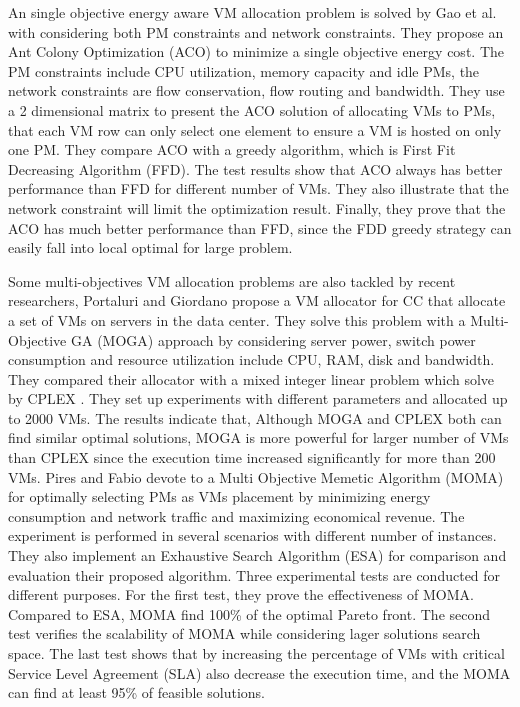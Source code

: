 \documentclass[onecolumn,10pt]{asme2ej}
\begin{document}
An single objective energy aware VM allocation problem is solved by Gao et al. \cite{gao2016energy} with considering both PM constraints and network constraints. They propose an Ant Colony Optimization (ACO) to minimize a single objective energy cost. The PM constraints include CPU utilization, memory capacity and idle PMs, the network constraints are flow conservation, flow routing and bandwidth. They use a 2 dimensional matrix to present the ACO solution of allocating VMs to PMs, that each VM row can only select one element to ensure a VM is hosted on only one PM. They compare ACO with a greedy algorithm, which is First Fit  Decreasing Algorithm (FFD). The test results show that ACO always has better performance than FFD for different number of VMs. They also illustrate that the network constraint will limit the optimization result. Finally, they prove that the ACO has much better performance than FFD, since the FDD greedy strategy can easily fall into local optimal for large problem. 

Some multi-objectives VM allocation problems are also tackled by recent researchers, Portaluri and Giordano \cite{portaluri2016multi} propose a VM allocator for CC that allocate a set of VMs on servers in the data center. They solve this problem with a Multi-Objective GA (MOGA) approach by considering server power, switch power consumption and resource utilization include CPU, RAM, disk and bandwidth. They compared their allocator with a mixed integer linear problem which solve by CPLEX \cite{IBM01}. They set up experiments with different parameters and allocated up to 2000 VMs. The results indicate that, Although MOGA and CPLEX both can find similar optimal solutions, MOGA is more powerful for larger number of VMs than CPLEX since the execution time increased significantly for more than 200 VMs. Pires and Fabio \cite{pires2013multi} devote to a Multi Objective Memetic Algorithm (MOMA) for optimally selecting PMs as VMs placement by minimizing energy consumption and network traffic and maximizing economical revenue. The experiment is performed in several scenarios with different number of instances. They also implement an Exhaustive Search Algorithm (ESA) for comparison and evaluation their proposed algorithm. Three experimental tests are conducted for different purposes. For the first test, they prove the effectiveness of MOMA. Compared to ESA, MOMA find 100\% of the optimal Pareto front. The second test verifies the scalability of MOMA while considering lager solutions search space. The last test shows that by increasing the percentage of VMs with critical Service Level Agreement (SLA) also decrease the execution time, and the MOMA can find at least 95\% of feasible solutions. 
\end{document}
